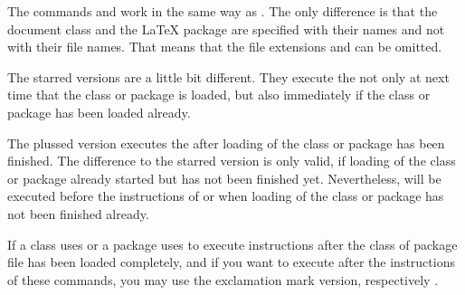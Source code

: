 \begin{Declaration}
\end{Declaration}%
The commands  and  work in the
same way as .  The only difference is that the
document class  and the {\LaTeX} package 
are specified with their names and not with their file names.  That
means that the file extensions  and  can be
omitted.  

The starred versions
are a little bit different. They execute the  not only at
next time that the class or package is loaded, but also immediately if the
class or package has been loaded already.

The
plussed version executes the
 after loading of the class or package has been
finished. The difference to the starred version is only valid, if loading of
the class or package already started but has not been finished
yet. Nevertheless,  will be executed before the
instructions of  or  when loading of
the class or package has not been finished already.

If a class uses
 or a package uses  to execute
instructions after the class of package file has been loaded completely, and
if you want to execute  after the instructions of these
commands, you may use the exclamation mark version,
 respectively
.

